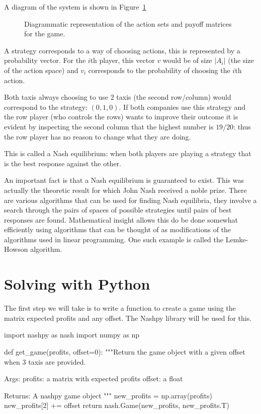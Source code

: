 A diagram of the system is shown in Figure~\ref{fig:taxi-firm-game}

\begin{figure}
\begin{center}

\end{center}
\caption{Diagrammatic representation of the action sets and payoff matrices for
    the game.}
\label{fig:taxi-firm-game}
\end{figure}

A strategy corresponds to a way of choosing actions, this is represented by a
probability vector. For the \(i\)th player, this vector \(v\) would be of size
\(|A_i|\) (the size of the action space) and \(v_i\) corresponds to the
probability of choosing the \(i\)th action.

Both taxis always choosing to use 2 taxis (the second row/column) would
correspond to the strategy: \((0, 1, 0)\).
If both companies use this strategy and the row player (who controls the
rows) wants to improve their outcome it is evident by inspecting the second
column that the highest number is \(19 / 20\): thus the row player has no reason
to change what they are doing.

This is called a Nash equilibrium: when both players are playing a
strategy that is the best response against the other.

An important fact is that a Nash equilibrium is guaranteed to exist. 
This was actually the theoretic result for which John Nash received a noble prize.
There are various algorithms that can be used for finding Nash equilibria, they involve
a search through the pairs of spaces of possible strategies until pairs of best 
responses are found. Mathematical insight allows this do be done somewhat efficiently
using algorithms that can be thought of as modifications of the algorithms used in linear programming.
One such example is called the Lemke-Howson algorithm.

\section{Solving with Python}\label{sec:solving-with-python}

The first step we will take is to write a function to create a game using the
matrix expected profits and any offset. The Nashpy library will be used for this.

\begin{pyin}
import nashpy as nash
import numpy as np


def get_game(profits, offset=0):
    """Return the game object with a given offset when 3 taxis
    are provided.

    Args:
        profits: a matrix with expected profits
        offset: a float

    Returns:
        A nashpy game object
    """
    new_profits = np.array(profits)
    new_profits[2] += offset
    return nash.Game(new_profits, new_profits.T)
\end{pyin}


